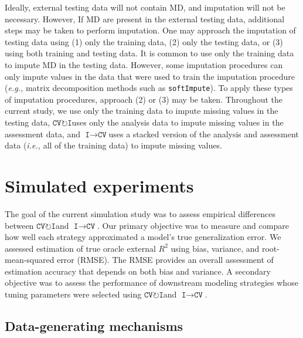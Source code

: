 \documentclass[AMA,STIX1COL,doublespace]{WileyNJD-v2}
\begin{document}
Ideally, external testing data will not contain MD, and imputation will
not be necessary. However, If MD are present in the external testing
data, additional steps may be taken to perform imputation. One may
approach the imputation of testing data using (1) only the training
data, (2) only the testing data, or (3) using both training and testing
data. It is common to use only the training data to impute MD in the
testing data. However, some imputation procedures can only impute values
in the data that were used to train the imputation procedure
(\textit{e.g., }matrix decomposition methods such as
\texttt{softImpute}).\citep{softImpute} To apply these types of
imputation procedures, approach (2) or (3) may be taken. Throughout the
current study, we use only the training data to impute missing values in
the testing data,
$\texttt{CV}\!\circlearrowright\!\texttt{I}$\space uses only the
analysis data to impute missing values in the assessment data, and
$\texttt{I}\!\!\rightarrow\!\texttt{CV}$\space uses a stacked version of
the analysis and assessment data (\textit{i.e., }all of the training
data) to impute missing values.

\section{Simulated experiments} \label{sec:sim}

The goal of the current simulation study was to assess empirical
differences between
$\texttt{CV}\!\circlearrowright\!\texttt{I}$\space and
$\texttt{I}\!\!\rightarrow\!\texttt{CV}$. Our primary objective was to
measure and compare how well each strategy approximated a model's true
generalization error. We assessed estimation of true oracle external
\(R^2\) using bias, variance, and root-mean-squared error (RMSE). The
RMSE provides an overall assessment of estimation accuracy that depends
on both bias and variance. A secondary objective was to assess the
performance of downstream modeling strategies whose tuning parameters
were selected using
$\texttt{CV}\!\circlearrowright\!\texttt{I}$\space and
$\texttt{I}\!\!\rightarrow\!\texttt{CV}$.

\subsection{Data-generating mechanisms} \label{subsec:data_gen}
\end{document}
